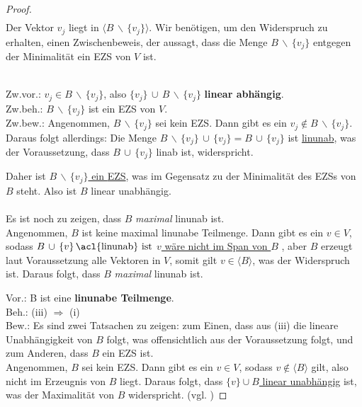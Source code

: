 \begin{proof}
\begin{align*}
\end{align*}
Der Vektor $v_j$ liegt in $\langle B \, \backslash \, \{v_j\} \rangle$. Wir benötigen, um den Widerspruch zu erhalten, einen Zwischenbeweis, der aussagt, dass die Menge $B \, \backslash \, \{v_j\}$ entgegen der Minimalität ein \acl{EZS} von $V$ ist.
\par
\begingroup
\leftskip=2cm
\noindent
\\Zw.vor.: $v_j \in B \, \backslash \, \{v_j\}$, also $ \{v_j\}\, \cup\, B \, \backslash \, \{v_j\}$ \textbf{linear abhängig}. 
\\Zw.beh.: $B \, \backslash \, \{v_j\}$ ist ein \acl{EZS} von $V$.
\\Zw.bew.: Angenommen, $B \, \backslash \, \{v_j\}$ sei kein \acl{EZS}. Dann gibt es ein $v_j \notin B \, \backslash \, \{v_j\}$. Daraus folgt allerdings: Die Menge $B \, \backslash \, \{v_j\} \,\cup\, \{v_j\} = B\, \cup\, \{v_j\} $ ist \underline{\acl{linunab}}, was der Voraussetzung, dass $B \,\cup\, \{v_j\}$ \acl{linab} ist, widerspricht.
\\
\par
\endgroup
\noindent Daher ist \underline{$B \, \backslash \, \{v_j\}$ ein \acl{EZS}}, was im Gegensatz zu der Minimalität des \acl{EZS}s von $B$ steht. Also ist $B$ linear unabhängig.
\\ \\ \indent Es ist noch zu zeigen, dass $B$ \emph{maximal} \acl{linunab} ist. 
\\Angenommen, $B$ ist keine maximal \acl{linunab}e Teilmenge.
Dann gibt es ein $v \in V$, sodass \( B \,\cup\, \{v\}\,\text{\acl{linunab} ist}\) {\textendash} \underline{$v$ wäre nicht im Span von $B$} {\textendash}, aber $B$ erzeugt laut Voraussetzung alle Vektoren in $V$, somit gilt $v \in \langle B \rangle$, was der Widerspruch ist. Daraus folgt, dass $B$ \emph{maximal} \acl{linunab} ist. 

\newpage
\noindent Vor.: B ist eine \textbf{ \acl{linunab}e Teilmenge}.
\\ Beh.: (iii) $\Rightarrow$ (i) 
\\ Bew.: Es sind zwei Tatsachen zu zeigen: zum Einen, dass aus (iii) die lineare Unabhängigkeit von $B$ folgt, was offensichtlich aus der Voraussetzung folgt, und zum Anderen, dass $B$ ein \acl{EZS} ist. 
\\ Angenommen, $B$ sei kein \acl{EZS}. Dann gibt es ein $v \in V$, sodass $v \notin \langle B \rangle$ gilt, also nicht im Erzeugnis von $B$ liegt. Daraus folgt, dass \underline{$\{v\} \cup B$ linear unabhängig} ist, was der Maximalität von $B$ widerspricht. (vgl. \cite[S. 59]{Beutel}) 
\end{proof}

